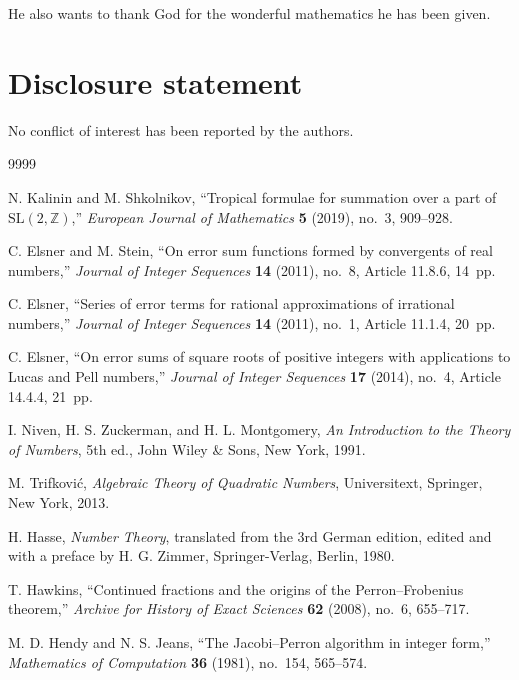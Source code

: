 \documentclass[]{interact}
\theoremstyle{plain}
\numberwithin{equation}{section} %
\numberwithin{table}{section} %
\numberwithin{figure}{section}
\begin{document}
He also wants to thank God for the wonderful mathematics he has been given.

\section*{Disclosure statement}
No conflict of interest has been reported by the authors.

\begin{thebibliography}{9999}

N. Kalinin and M. Shkolnikov,
``Tropical formulae for summation over a part of $\mathrm{SL}(2,\mathbb{Z})$,''
\emph{European Journal of Mathematics} \textbf{5} (2019), no.~3, 909--928.

C. Elsner and M. Stein,
``On error sum functions formed by convergents of real numbers,''
\emph{Journal of Integer Sequences} \textbf{14} (2011), no.~8, Article 11.8.6, 14~pp.

C. Elsner,
``Series of error terms for rational approximations of irrational numbers,''
\emph{Journal of Integer Sequences} \textbf{14} (2011), no.~1, Article 11.1.4, 20~pp.

C. Elsner,
``On error sums of square roots of positive integers with applications to Lucas and Pell numbers,''
\emph{Journal of Integer Sequences} \textbf{17} (2014), no.~4, Article 14.4.4, 21~pp.

I. Niven, H. S. Zuckerman, and H. L. Montgomery,
\emph{An Introduction to the Theory of Numbers}, 5th ed.,
John Wiley \& Sons, New York, 1991.

M. Trifkovi\'{c},
\emph{Algebraic Theory of Quadratic Numbers},
Universitext, Springer, New York, 2013.

H. Hasse,
\emph{Number Theory},
translated from the 3rd German edition, edited and with a preface by H. G. Zimmer,
Springer-Verlag, Berlin, 1980.

T. Hawkins,
``Continued fractions and the origins of the Perron--Frobenius theorem,''
\emph{Archive for History of Exact Sciences} \textbf{62} (2008), no.~6, 655--717.

M. D. Hendy and N. S. Jeans,
``The Jacobi--Perron algorithm in integer form,''
\emph{Mathematics of Computation} \textbf{36} (1981), no.~154, 565--574.


\end{thebibliography}
\end{document}
